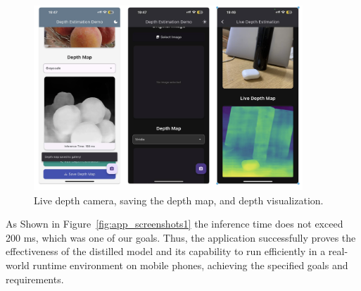 \begin{figure}[htbp!]
    \centering
    \includegraphics[width=0.9\textwidth]{images/app_screenshots_2.png}
    \caption{Live depth camera, saving the depth map, and depth visualization.}
    \label{fig:app_screenshots2}
\end{figure}

As Shown in Figure~\ref{fig:app_screenshots1} the inference time does not exceed 200 ms, which was one of our goals. Thus, the application successfully proves the effectiveness of the distilled model and its capability to run efficiently in a real-world runtime environment on mobile phones, achieving the specified goals and requirements.